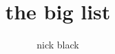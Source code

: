 \documentclass[ebook,10pt,openany,oneside]{memoir}
\title{the big list}
\author{nick black}
\begin{document}
\centering
\footnotesize



\end{document}
